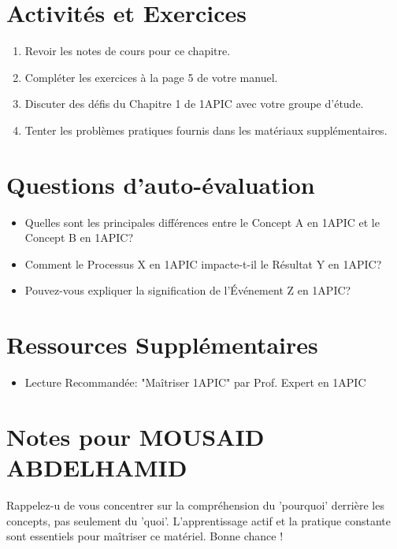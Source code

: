 \documentclass{article}
\begin{document}
\section*{Activités et Exercices}
\begin{enumerate}
    \item Revoir les notes de cours pour ce chapitre.
    \item Compléter les exercices à la page {5} de votre manuel.
    \item Discuter des défis du Chapitre 1 de 1APIC avec votre groupe d'étude.
    \item Tenter les problèmes pratiques fournis dans les matériaux supplémentaires.
\end{enumerate}

\section*{Questions d'auto-évaluation}
\begin{itemize}
    \item Quelles sont les principales différences entre le Concept A en 1APIC et le Concept B en 1APIC?
    \item Comment le Processus X en 1APIC impacte-t-il le Résultat Y en 1APIC?
    \item Pouvez-vous expliquer la signification de l'Événement Z en 1APIC?
\end{itemize}

\section*{Ressources Supplémentaires}
\begin{itemize}
    \item Lecture Recommandée: "Maîtriser 1APIC" par Prof. Expert en 1APIC
\end{itemize}

\section*{Notes pour MOUSAID ABDELHAMID}
Rappelez-u de vous concentrer sur la compréhension du 'pourquoi' derrière les concepts, pas seulement du 'quoi'. L'apprentissage actif et la pratique constante sont essentiels pour maîtriser ce matériel. Bonne chance !
\end{document}
